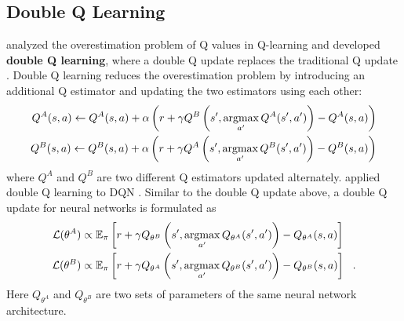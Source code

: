 \subsection{Double Q Learning}
\citeauthor{DoubleQlearning_Hasselt_2010} analyzed the overestimation problem of Q values in Q-learning and developed \textbf{double Q learning}, where a double Q update replaces the traditional Q update \cite{DoubleQlearning_Hasselt_2010}.
Double Q learning reduces the overestimation problem by introducing an additional Q estimator and updating the two estimators using each other:
\begin{align*}
    Q^{A}(s, a) \leftarrow Q^{A}(s, a)+ \alpha \left(r+\gamma Q^{B}\left(s', \operatorname*{argmax}_{a'}{Q^A(s', a')}\right)-Q^{A}(s, a)\right)  \\
    Q^{B}(s, a) \leftarrow Q^{B}(s, a)+ \alpha \left(r+\gamma Q^{A}\left(s', \operatorname*{argmax}_{a'}{Q^B(s', a')}\right)-Q^{B}(s, a)\right)
\end{align*}
where $Q^A$ and $Q^B$ are two different Q estimators updated alternately.
\citeauthor{DeepReinforcementLearning_Hasselt.Guez.ea_2016} applied double Q learning to DQN \cite{DeepReinforcementLearning_Hasselt.Guez.ea_2016}.
Similar to the double Q update above, a double Q update for neural networks is formulated as
\begin{align*}
    \mathcal{L}(\theta^A)  & \propto \mathbb{E}_\pi \left[ r + \gamma Q_{\theta^B}\left(s', \operatorname*{argmax}_{a'}{Q_{\theta^A}(s', a')} \right) - Q_{\theta^A}(s, a) \right]  \\
    \mathcal{L}(\theta^B)  & \propto \mathbb{E}_\pi \left[ r + \gamma Q_{\theta^A}\left(s', \operatorname*{argmax}_{a'}{Q_{\theta^B}(s', a')} \right) - Q_{\theta^B}(s, a) \right] ~~ .
\end{align*}
Here $Q_{\theta^A}$ and $Q_{\theta^B}$ are two sets of parameters of the same neural network architecture.

